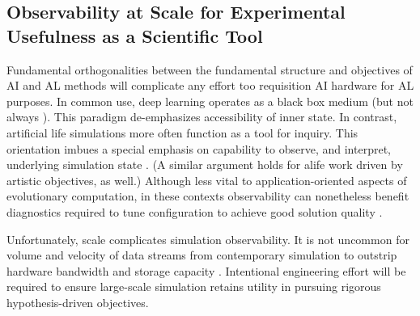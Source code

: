 
\subsection{Observability at Scale for Experimental Usefulness as a Scientific Tool}


Fundamental orthogonalities between the fundamental structure and objectives of AI and AL methods will complicate any effort too requisition AI hardware for AL purposes.
In common use, deep learning operates as a black box medium \citep{TODO} (but not always \citep{TODO}).
This paradigm de-emphasizes accessibility of inner state.
In contrast, artificial life simulations more often function as a tool for inquiry.
This orientation imbues a special emphasis on capability to observe, and interpret, underlying simulation state \citep{moreno2023toward,horgan1995complexity}.
(A similar argument holds for alife work driven by artistic objectives, as well.)
Although less vital to application-oriented aspects of evolutionary computation, in these contexts observability can nonetheless benefit diagnostics required to tune configuration to achieve good solution quality \citep{hernandez2022can}.

Unfortunately, scale complicates simulation observability.
It is not uncommon for volume and velocity of data streams from contemporary simulation to outstrip hardware bandwidth and storage capacity \citep{TODODOEDATAREDUCTIONPHAMPHLET}.
Intentional engineering effort will be required to ensure large-scale simulation retains utility in pursuing rigorous hypothesis-driven objectives.

